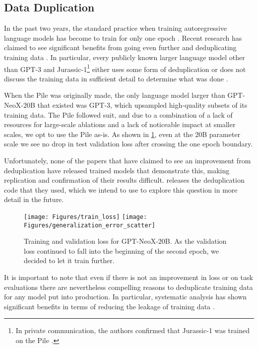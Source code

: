 \documentclass[11pt]{article}
\newcommand{\model}{GPT-NeoX-20B}
\begin{document}
\subsection{Data Duplication}

In the past two years, the standard practice when training autoregressive language models has become to train for only one epoch \citep{komatsuzaki2019one,kaplan2020scaling,henighan2020scaling}. Recent research has claimed to see significant benefits from going even further and deduplicating training data \citep{lee2021deduplicating,kandpal2022deduplicating,roberts2022scaling}. In particular, every publicly known larger language model other than GPT-3 \citep{brown2020language} and Jurassic-1\footnote{In private communication, the authors confirmed that Jurassic-1 was trained on the Pile \citep{gao2020pile}.} either uses some form of deduplication \citep{rae2021gopher,askell2021general,zeng2021pangualpha,sun2021ernie,megatron-530b,hoffmann2022chinchilla,chowdhery2022palm} or does not discuss the training data in sufficient detail to determine what was done \citep{kim2021changes}.

When the Pile was originally made, the only language model larger than \model{} that existed was GPT-3, which upsampled high-quality subsets of its training data. The Pile followed suit, and due to a combination of a lack of resources for large-scale ablations and a lack of noticeable impact at smaller scales, we opt to use the Pile as-is. As shown in \cref{fig:loss}, even at the 20B parameter scale we see no drop in test validation loss after crossing the one epoch boundary.

Unfortunately, none of the papers that have claimed to see an improvement from deduplication have released trained models that demonstrate this, making replication and confirmation of their results difficult. \citet{lee2021deduplicating} releases the deduplication code that they used, which we intend to use to explore this question in more detail in the future.

\begin{figure}
    \centering
    \texttt{[image: Figures/train\_loss]}
    \texttt{[image: Figures/generalization\_error\_scatter]}
    \caption{Training and validation loss for GPT-NeoX-20B. As the validation loss continued to fall into the beginning of the second epoch, we decided to let it train further.}
    \label{fig:loss}
\end{figure}

It is important to note that even if there is not an improvement in loss or on task evaluations there are nevertheless compelling reasons to deduplicate training data for any model put into production. In particular, systematic analysis has shown significant benefits in terms of reducing the leakage of training data \citep{lee2021deduplicating,zhang2021counterfactual,carlini2022quantifying,kandpal2022deduplicating}.
\end{document}
